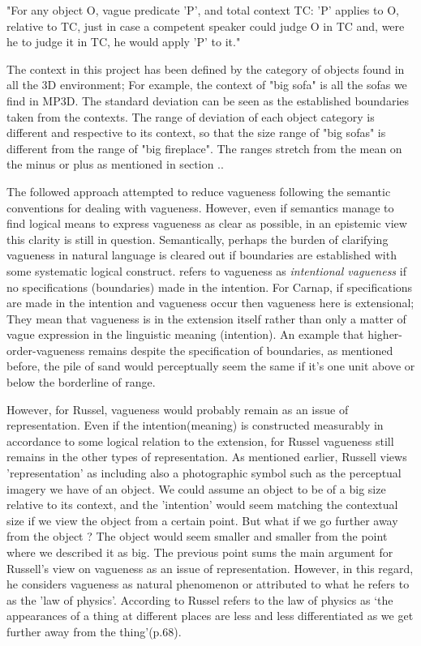"For any object O, vague predicate 'P', and total context TC:
'P' applies to O, relative to TC, just in case a competent
speaker could judge O in TC and, were he to judge it in
TC, he would apply 'P' to it."

The context in this project has been defined by the category of objects found in all the 3D environment; For example, the context of "big sofa" is all the sofas we find in MP3D. The standard deviation can be seen as the established boundaries taken from the contexts. The range of deviation of each object category is different and respective to its context, so that the size range of "big sofas" is different from the range of "big fireplace". The ranges stretch from the mean on the minus or plus as mentioned in section ..


The followed approach attempted to reduce vagueness following the semantic conventions for dealing with vagueness. However, even if semantics manage to find logical means to express vagueness as clear as possible, in an epistemic view this clarity is still in question. Semantically, perhaps the burden of clarifying vagueness in natural language is cleared out if boundaries are established with some systematic logical construct. \cite{carnap1955meaning} refers to vagueness  as \emph{intentional vagueness} if no specifications (boundaries) made in the intention. For Carnap, if specifications are made in the intention and vagueness occur then vagueness here is extensional; They mean that vagueness is in the extension itself rather than only a matter of vague expression in the linguistic meaning (intention). An example that higher-order-vagueness remains despite the specification of boundaries, as mentioned before,  the pile of sand would perceptually seem the same if it's one unit above or below the borderline of range. 

However, for  Russel, vagueness would probably remain as an issue of representation. Even if the intention(meaning) is constructed measurably in accordance to some logical relation to the extension, for Russel vagueness still remains in the other types of representation. As mentioned earlier, Russell views 'representation' as including also a photographic symbol such as the perceptual imagery we have of an object. We could assume an object to be of a big size relative to its context, and the 'intention' would seem matching the contextual size if we view the object from a certain point. But what if we go further away from the object ? The object would seem smaller and smaller from the point where we described it as big. The previous point sums the main argument for Russell's view on vagueness as an issue of representation. However, in this regard, he considers vagueness as natural phenomenon or attributed to what he refers to as the 'law of physics'. According to \cite{williamson2002vagueness} Russel refers to the law of physics as ‘the appearances of a thing at different places are less and less differentiated as we get further away from the thing’(p.68). 

